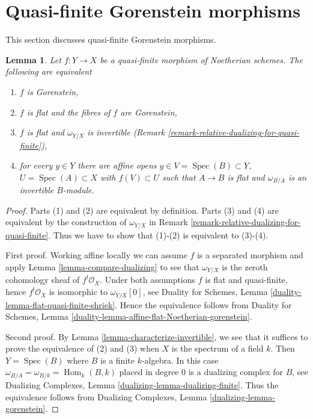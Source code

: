 \documentclass{stacks-project}
\theoremstyle{plain}
\newtheorem{lemma}[subsection]{Lemma}
\theoremstyle{definition}
\theoremstyle{remark}
\numberwithin{equation}{subsection}
\def\Spec{\mathop{\mathrm{Spec}}}
\def\Hom{\mathop{\mathrm{Hom}}\nolimits}
\begin{document}
\section{Quasi-finite Gorenstein morphisms}
\label{section-gorenstein-lci}

\noindent
This section discusses quasi-finite Gorenstein morphisms.

\begin{lemma}
\label{lemma-gorenstein-quasi-finite}
Let $f : Y \to X$ be a quasi-finite morphism of Noetherian schemes.
The following are equivalent
\begin{enumerate}
\item $f$ is Gorenstein,
\item $f$ is flat and the fibres of $f$ are Gorenstein,
\item $f$ is flat and $\omega_{Y/X}$ is invertible
(Remark \ref{remark-relative-dualizing-for-quasi-finite}),
\item for every $y \in Y$ there are affine opens
$y \in V = \Spec(B) \subset Y$, $U = \Spec(A) \subset X$
with $f(V) \subset U$ such that $A \to B$ is flat
and $\omega_{B/A}$ is an invertible $B$-module.
\end{enumerate}
\end{lemma}

\begin{proof}
Parts (1) and (2) are equivalent by definition. Parts (3) and (4)
are equivalent by the construction of $\omega_{Y/X}$ in
Remark \ref{remark-relative-dualizing-for-quasi-finite}.
Thus we have to show that (1)-(2) is equivalent to (3)-(4).

\medskip\noindent
First proof. Working affine locally we can assume $f$ is a separated
morphism and apply Lemma \ref{lemma-compare-dualizing} to see that
$\omega_{Y/X}$ is the zeroth cohomology sheaf of $f^!\mathcal{O}_X$.
Under both assumptions $f$ is flat and quasi-finite, hence
$f^!\mathcal{O}_X$ is isomorphic to $\omega_{Y/X}[0]$, see
Duality for Schemes, Lemma \ref{duality-lemma-flat-quasi-finite-shriek}. Hence
the equivalence follows from
Duality for Schemes, Lemma
\ref{duality-lemma-affine-flat-Noetherian-gorenstein}.

\medskip\noindent
Second proof. By Lemma \ref{lemma-characterize-invertible},
we see that it suffices to prove the equivalence of
(2) and (3) when $X$ is the spectrum of a field $k$.
Then $Y = \Spec(B)$ where $B$ is a finite $k$-algebra.
In this case $\omega_{B/A} = \omega_{B/k} = \Hom_k(B, k)$
placed in degree $0$ is a dualizing complex for $B$, see
Dualizing Complexes, Lemma \ref{dualizing-lemma-dualizing-finite}.
Thus the equivalence follows from
Dualizing Complexes, Lemma \ref{dualizing-lemma-gorenstein}.
\end{proof}
\end{document}
